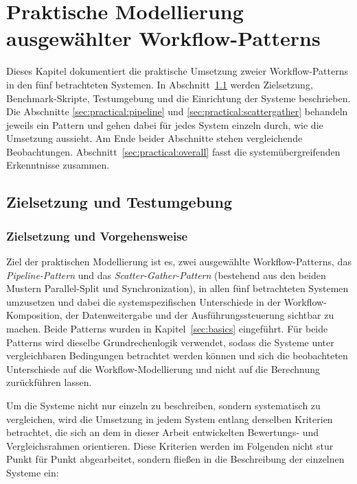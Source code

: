%


\lstset{breaklines=true, breakatwhitespace=false}

\chapter{Praktische Modellierung ausgewählter Workflow-Patterns}
\label{sec:practical}

Dieses Kapitel dokumentiert die praktische Umsetzung zweier Workflow-Patterns in den fünf
betrachteten Systemen. In Abschnitt~\ref{sec:practical:setup} werden Zielsetzung,
Benchmark-Skripte, Testumgebung und die Einrichtung der Systeme beschrieben. Die Abschnitte
\ref{sec:practical:pipeline} und \ref{sec:practical:scattergather} behandeln jeweils ein
Pattern und gehen dabei für jedes System einzeln durch, wie die Umsetzung aussieht. Am Ende
beider Abschnitte stehen vergleichende Beobachtungen. Abschnitt~\ref{sec:practical:overall}
fasst die systemübergreifenden Erkenntnisse zusammen.

\section{Zielsetzung und Testumgebung}
\label{sec:practical:setup}

\subsection{Zielsetzung und Vorgehensweise}
\label{sec:practical:setup:goal}

Ziel der praktischen Modellierung ist es, zwei ausgewählte Workflow-Patterns, das
\emph{Pipeline-Pattern} und das \emph{Scatter-Gather-Pattern} (bestehend aus den beiden Mustern
Parallel-Split und Synchronization), in allen fünf betrachteten Systemen umzusetzen und dabei die
systemspezifischen Unterschiede in der Workflow-Komposition, der Datenweitergabe und der
Ausführungssteuerung sichtbar zu machen. Beide Patterns wurden in Kapitel~\ref{sec:basics}
eingeführt. Für beide Patterns wird dieselbe Grundrechenlogik verwendet, sodass die Systeme unter
vergleichbaren Bedingungen betrachtet werden können und sich die beobachteten Unterschiede auf die
Workflow-Modellierung und nicht auf die Berechnung zurückführen lassen.

Um die Systeme nicht nur einzeln zu beschreiben, sondern systematisch zu vergleichen, wird die
Umsetzung in jedem System entlang derselben Kriterien betrachtet, die sich an dem in dieser Arbeit
entwickelten Bewertungs- und Vergleichsrahmen orientieren. Diese Kriterien werden im Folgenden
nicht stur Punkt für Punkt abgearbeitet, sondern fließen in die Beschreibung der einzelnen Systeme
ein:

